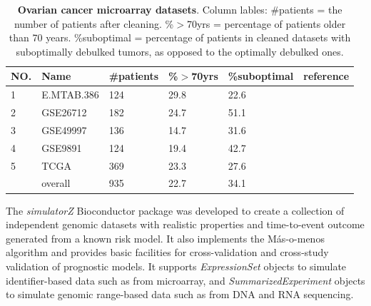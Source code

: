 \documentclass{bioinfo}
\begin{document}
 \begin{table}[!t]
    \begin{tabular*}{1\textwidth}{@{\extracolsep{\fill}}llllll}
      NO. & Name & \#patients & \%$>$70yrs & \%suboptimal & reference\\
      \hline
      1 & E.MTAB.386 & 124 & 29.8 & 22.6  &  \citet{bentink2012angiogenic} \\
       \hline
       2 & GSE26712 & 182 & 24.7 & 51.1 & \citet{bonome2008gene} \\
       \hline
       3 & GSE49997 & 136 & 14.7 & 31.6 & \citet{pils2012validating} \\
       \hline
       4 & GSE9891 & 124 & 19.4 & 42.7  & \citet{tothill2008novel} \\
       \hline
       5 & TCGA & 369 & 23.3 & 27.6 & \citet{cancer2011integrated} \\
       \hline
      \quad & overall & 935 & 22.7 &  34.1 & \\
      \hline
    \end{tabular*}
    \caption{\textbf{Ovarian cancer microarray datasets}. Column lables:
      \#patients = the number of patients after cleaning. \%$>$70yrs = percentage 
      of patients older than 70 years. \%suboptimal =
      percentage of patients in cleaned datasets with suboptimally debulked tumors, as opposed to the optimally debulked ones.}%
    \label{table-datasets-ovarian}
  \end{table}
  
  The \emph{simulatorZ} Bioconductor package was developed to
  create a collection of independent genomic datasets with
  realistic properties and time-to-event outcome generated from a
  known risk model. It also implements the M\'{a}s-o-menos algorithm
  \citep{Zhao2014} and provides basic facilities for 
  cross-validation and cross-study validation of prognostic models.
  It supports \emph{ExpressionSet} objects to simulate
  identifier-based data such as from microarray, and
  \emph{SummarizedExperiment} objects to simulate genomic range-based
  data such as from DNA and RNA sequencing.
\end{document}
